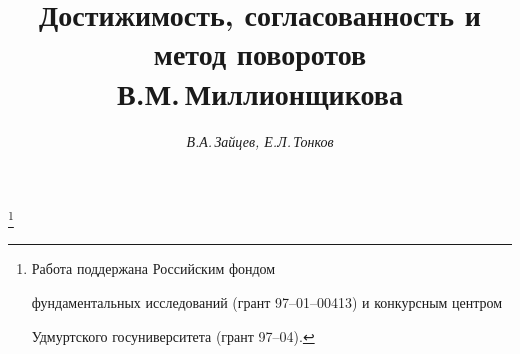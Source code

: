 




% 





\newcommand{\ve}{\varepsilon}


\newcommand{\fy}{\infty}


\newcommand{\vt}{\vartheta}


\newcommand{\R}{\Bbb R}


\newcommand{\A}{\Bbb A}


\newcommand{\col}{\operatorname{col}}


\newcommand{\rank}{\operatorname{rank}}


\newcommand{\Int}{\operatorname{int}}


\newcommand{\Vc}{\operatorname{vec}}


\newcommand{\Spp}{\operatorname{Sp}}


\newcommand{\tts}[1]{}







 


\setcounter{page}{45}












\author{\it В.А.\,Зайцев, Е.Л.\,Тонков}




\title{Достижимость, согласованность и метод поворотов \\


В.М.\,Миллионщикова}





\thanks{Работа поддержана Российским фондом


фундаментальных исследований (грант 97--01--00413) и конкурсным центром


Удмуртского госуниверситета (грант 97--04).}



